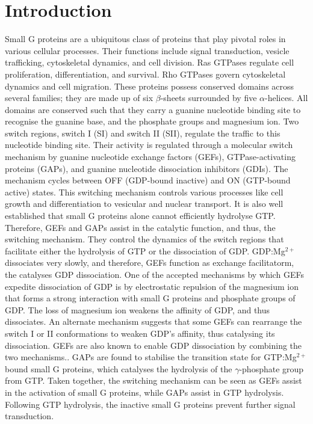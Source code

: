 \documentclass[12pt,a4paper]{achemso}
\begin{document}
\section{Introduction}
Small G proteins are a ubiquitous class of proteins that play pivotal roles in various cellular processes. Their functions include signal transduction, vesicle trafficking, cytoskeletal dynamics, and cell division. Ras GTPases regulate cell proliferation, differentiation, and survival. Rho GTPases govern cytoskeletal dynamics and cell migration.  These proteins possess conserved domains across several families; they are made up of six $\beta$-sheets surrounded by five $\alpha$-helices. All domains are conserved such that they carry a guanine nucleotide binding site to recognise the guanine base, and the phosphate groups and magnesium ion\cite{toma2019structural, cherfils2013regulation}. Two switch regions, switch I (SI) and switch II (SII), regulate the traffic to this nucleotide binding site. Their activity is regulated through a molecular switch mechanism by guanine nucleotide exchange factors (GEFs), GTPase-activating proteins (GAPs), and guanine nucleotide dissociation inhibitors (GDIs)\cite{cherfils2013regulation}. The mechanism cycles between OFF (GDP-bound inactive) and ON (GTP-bound active) states. This switching mechanism controls various processes like cell growth and differentiation to vesicular and nuclear transport\cite{cherfils2013regulation, loirand2013small}. It is also well established that small G proteins alone cannot efficiently hydrolyse GTP. Therefore,  GEFs and GAPs assist in the catalytic function, and thus, the switching mechanism. They control the dynamics of the switch regions that facilitate either the hydrolysis of GTP or the dissociation of GDP. GDP:Mg$^{2+}$ dissociates very slowly, and therefore, GEFs function as exchange facilitatorm, the catalyses GDP dissociation. One of the accepted mechanisms by which GEFs expedite dissociation of GDP is by electrostatic repulsion of the magnesium ion that forms a strong interaction with small G proteins and phosphate groups of GDP. The loss of magnesium ion weakens the affinity of GDP, and thus dissociates. An alternate mechanism suggests that some GEFs can rearrange the switch I or II conformations to weaken GDP's affinity, thus catalysing its dissociation.  GEFs are also known to enable GDP dissociation by combining the two mechanisms.\cite{cherfils1999gefs, cherfils2014gefs}. GAPs are found to stabilise the transition state for GTP:Mg$^{2+}$ bound small G proteins, which catalyses the hydrolysis of the $\gamma$-phosphate group from GTP. Taken together, the switching mechanism can be seen as GEFs assist in the activation of small G proteins, while GAPs assist in GTP hydrolysis. Following GTP hydrolysis, the inactive small G proteins prevent further signal transduction\cite{bos2007gefs}. 
\end{document}
